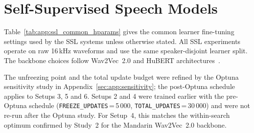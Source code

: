 \section{Self-Supervised Speech Models}
\label{sec:app:ssl_hparams}

Table~\ref{tab:app:ssl_common_hparams} gives the common learner fine-tuning
settings used by the SSL systems unless otherwise stated. All SSL experiments
operate on raw 16\,kHz waveforms and use the same speaker-disjoint learner
split. The backbone choices follow Wav2Vec~2.0 and HuBERT
architectures~\cite{baevski2020,hsu2021}.

The unfreezing point and the total update budget were refined by the Optuna
sensitivity study in Appendix~\ref{sec:app:sensitivity}; the post-Optuna
schedule applies to Setups 3, 5 and 6. Setups 2 and 4 were trained earlier
with the pre-Optuna schedule (\texttt{FREEZE\_UPDATES}\,=\,5\,000,
\texttt{TOTAL\_UPDATES}\,=\,30\,000) and were not re-run after the Optuna
study. For Setup~4, this matches the within-search optimum confirmed by
Study~2 for the Mandarin Wav2Vec~2.0 backbone.

